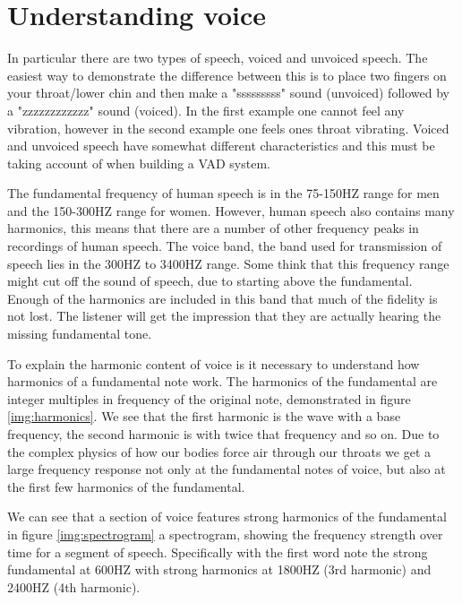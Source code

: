 \documentclass[ %
                    author={Sam Phippen},
                supervisor={Dr. Rafal Bogacz},
                     title={Real time voice activity detectors in noisy personal computing environments},
                  subtitle={},
                    degree={MEng},
                      year={2012} ]{thesis}
\begin{document}
\section{Understanding voice}

In particular there are two types of speech, voiced and unvoiced speech. The
easiest way to demonstrate the difference between this is to place two fingers
on your throat/lower chin and then make a "sssssssss" sound (unvoiced) followed
by a "zzzzzzzzzzzz" sound (voiced). In the first example one cannot feel any
vibration, however in the second example one feels ones throat vibrating.
Voiced and unvoiced speech have somewhat different characteristics and this
must be taking account of when building a VAD system\cite{atal}.

The fundamental frequency of human speech is in the 75-150HZ range for men and
the 150-300HZ range for women\cite{Traunmüller}. However, human speech also
contains many harmonics, this means that there are a number of other frequency
peaks in recordings of human speech. The voice band, the band used for
transmission of speech lies in the 300HZ to 3400HZ range. Some think that this
frequency range might cut off the sound of speech, due to starting above the
fundamental. Enough of the harmonics are included in this band that much of the
fidelity is not lost. The listener will get the impression that they are
actually hearing the missing fundamental tone.

To explain the harmonic content of voice is it necessary to understand how
harmonics of a fundamental note work. The harmonics of the fundamental are
integer multiples in frequency of the original note, demonstrated in figure
\ref{img:harmonics}. We see that the first harmonic is the wave with a base
frequency, the second harmonic is with twice that frequency and so on. Due to
the complex physics of how our bodies force air through our throats we get a
large frequency response not only at the fundamental notes of voice, but also
at the first few harmonics of the fundamental.

We can see that a section of voice features strong harmonics of the fundamental
in figure \ref{img:spectrogram} a spectrogram, showing the frequency strength
over time for a segment of speech. Specifically with the first word note the
strong fundamental at 600HZ with strong harmonics at 1800HZ (3rd harmonic) and
2400HZ (4th harmonic).
\end{document}
